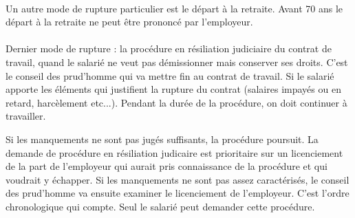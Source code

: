 \paragraph{}
Un autre mode de rupture particulier est le départ à la retraite.
Avant 70 ans le départ à la retraite ne peut être prononcé par l’employeur. 

\paragraph{}
Dernier mode de rupture : la procédure en résiliation judiciaire du contrat de travail, quand le salarié ne veut pas démissionner mais conserver ses droits.
C’est le conseil des prud’homme qui va mettre fin au contrat de travail. Si le salarié apporte les éléments qui justifient la rupture du contrat (salaires impayés ou en retard, harcèlement etc...).
Pendant la durée de la procédure, on doit continuer à travailler.

Si les manquements ne sont pas jugés suffisants, la procédure poursuit.
La demande de procédure en résiliation judicaire est prioritaire sur un licenciement de la part de l’employeur qui aurait pris connaissance de la procédure et qui voudrait y échapper.
Si les manquements ne sont pas assez caractérisés, le conseil des prud’homme va ensuite examiner le licenciement de l’employeur.
C’est l’ordre chronologique qui compte.
Seul le salarié peut demander cette procédure.
